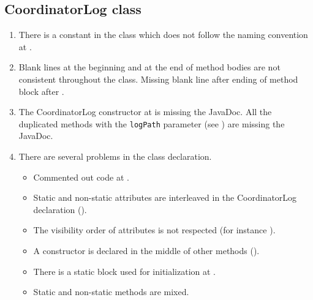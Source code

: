 \subsection{CoordinatorLog class}
\label{sec:coordinatorlog-class}
\begin{enumerate}
    \item {} There is a constant in the class which does not follow the naming convention at .
    \item {} Blank lines at the beginning and at the end of method bodies are not consistent throughout the class.
    Missing blank line after ending of method block after .
    \item {} The CoordinatorLog constructor at  is missing the JavaDoc.
    All the duplicated methods with the \texttt{logPath} parameter (see ) are missing the JavaDoc.
    \item {} There are several problems in the class declaration.
    \begin{itemize}
        \item  Commented out code at .
        \item Static and non-static attributes are interleaved in the CoordinatorLog declaration ().
        \item The visibility order of attributes is not respected (for instance ).
        \item A constructor is declared in the middle of other methods ().
        \item There is a static block used for initialization at .
        \item Static and non-static methods are mixed.
    \end{itemize}


\end{enumerate}
